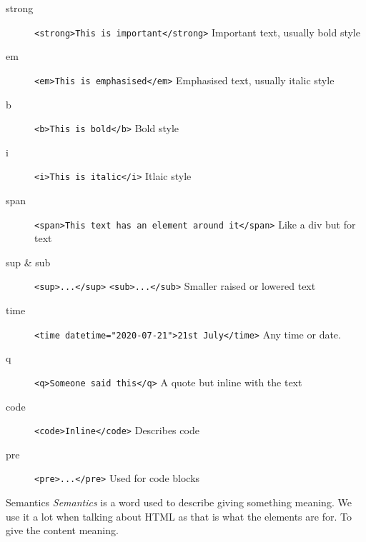 \begin{description}
    \item[strong] \texttt{<strong>This is important</strong>} Important text, usually bold style
    \item[em] \texttt{<em>This is emphasised</em>} Emphasised text, usually italic style
    \item[b] \texttt{<b>This is bold</b>} Bold style
    \item[i] \texttt{<i>This is italic</i>} Itlaic style
    \item[span] \texttt{<span>This text has an element around it</span>} Like a div but for text
    \item[sup \& sub] \texttt{<sup>...</sup>} \texttt{<sub>...</sub>} Smaller raised or lowered text
    \item[time] \texttt{<time datetime="2020-07-21">21st July</time>} Any time or date.
    \item[q] \texttt{<q>Someone said this</q>} A quote but inline with the text
    \item[code] \texttt{<code>Inline</code>} Describes code
    \item[pre] \texttt{<pre>...</pre>} Used for code blocks
\end{description}

\begin{infobox}{Semantics}
    \textit{Semantics} is a word used to describe giving something meaning. We use it a lot when talking about HTML as that is what the elements are for. To give the content meaning.
\end{infobox}
